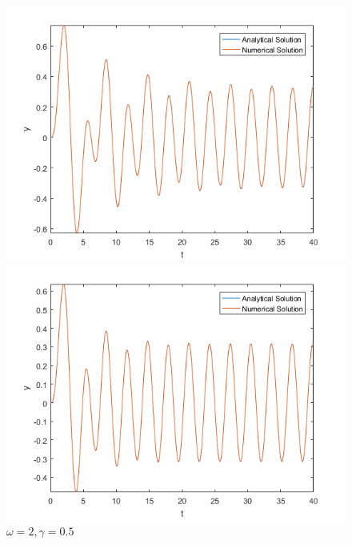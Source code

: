 \documentclass[10pt,a4paper]{report}
\begin{document}
\begin{figure}[ht]
\begin{minipage}[b]{0.5\linewidth}
\centering
\includegraphics[width=\textwidth]{q7w2g025.png}
\caption{$\omega=2, \gamma=0.25$}
\label{fig:figure1}
\end{minipage}
\hspace{0.5cm}
\begin{minipage}[b]{0.5\linewidth}
\centering
\includegraphics[width=\textwidth]{q7w2g05.png}
\caption{$\omega=2, \gamma=0.5$}
\label{fig:figure2}
\end{minipage}
\end{figure}
\end{document}
